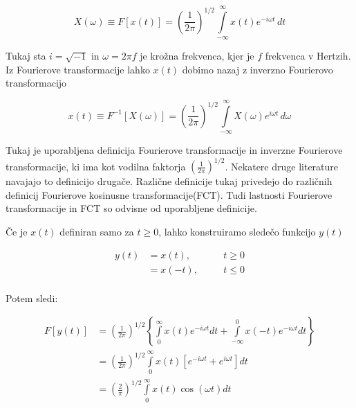 \documentclass[a4paper,12pt,openright]{book}
\begin{document}
\begin{equation}
X(\omega) \equiv F[x(t)] = \left( \frac{1}{2 \pi} \right)^{1/2} \int\limits_{-\infty}^{\infty} x(t) e^{-i \omega t} \,dt
\label{eq:FT}
\end{equation}

Tukaj sta $i = \sqrt{-1}$ in $\omega = 2 \pi f$ je krožna frekvenca, kjer je $f$ frekvenca v Hertzih. Iz Fourierove transformacije lahko $x(t)$ dobimo nazaj z inverzno Fourierovo transformacijo

\begin{equation}
x(t) \equiv F^{-1}[X(\omega)] = \left( \frac{1}{2 \pi} \right)^{1/2} \int\limits_{-\infty}^{\infty} X(\omega) e^{i \omega t} \,d\omega
\label{eq:IFT}
\end{equation}

Tukaj je uporabljena definicija Fourierove transformacije in inverzne Fourierove transformacije, ki ima kot vodilna faktorja $\left( \frac{1}{2 \pi} \right)^{1/2}$. Nekatere druge literature navajajo to definicijo drugače. Različne definicije tukaj privedejo do različnih definicij Fourierove kosinusne transformacije(FCT). Tudi lastnosti Fourierove transformacije in FCT so odvisne od uporabljene definicije.\par

Če je $x(t)$ definiran samo za $t \geq 0$, lahko konstruiramo sledečo funkcijo $y(t)$

\begin{equation}
  \begin{alignedat}{2}
    y(t) & = x(t),  \quad && t \geq 0\\
         & = x(-t), \quad && t \leq 0\\
  \end{alignedat}
\end{equation}

Potem sledi:

\begin{equation}
  \begin{aligned}
    F[y(t)] & = \left( \frac{1}{2 \pi} \right)^{1/2}
              \left\{ \int\limits_{0}^{\infty} x(t) e^{-i \omega t} dt +
                  \int\limits_{-\infty}^{0} x(-t) e^{-i \omega t} dt \right\}\\
            & = \left( \frac{1}{2 \pi} \right)^{1/2}
                \int\limits_{0}^{\infty} x(t) \left[ e^{-i \omega t} + 
                                                     e^{i \omega t}\right] dt\\
            & = \left( \frac{2}{\pi} \right)^{1/2}
                \int\limits_{0}^{\infty} x(t)  \cos(\omega t) dt\\
  \end{aligned}
\label{eq:izpeljava_FCT}
\end{equation}
\end{document}
